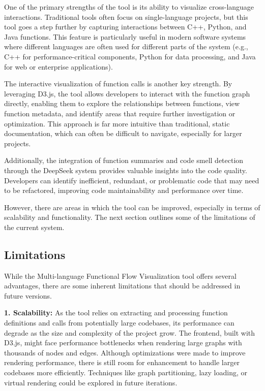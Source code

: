 \documentclass[10pt,twocolumn]{article}
\begin{document}
One of the primary strengths of the tool is its ability to visualize cross-language interactions. Traditional tools often focus on single-language projects, but this tool goes a step further by capturing interactions between C++, Python, and Java functions. This feature is particularly useful in modern software systems where different languages are often used for different parts of the system (e.g., C++ for performance-critical components, Python for data processing, and Java for web or enterprise applications).

The interactive visualization of function calls is another key strength. By leveraging D3.js, the tool allows developers to interact with the function graph directly, enabling them to explore the relationships between functions, view function metadata, and identify areas that require further investigation or optimization. This approach is far more intuitive than traditional, static documentation, which can often be difficult to navigate, especially for larger projects.

Additionally, the integration of function summaries and code smell detection through the DeepSeek system provides valuable insights into the code quality. Developers can identify inefficient, redundant, or problematic code that may need to be refactored, improving code maintainability and performance over time.

However, there are areas in which the tool can be improved, especially in terms of scalability and functionality. The next section outlines some of the limitations of the current system.

\subsection{Limitations}

While the Multi-language Functional Flow Visualization tool offers several advantages, there are some inherent limitations that should be addressed in future versions.

\textbf{1. Scalability:}  
As the tool relies on extracting and processing function definitions and calls from potentially large codebases, its performance can degrade as the size and complexity of the project grow. The frontend, built with D3.js, might face performance bottlenecks when rendering large graphs with thousands of nodes and edges. Although optimizations were made to improve rendering performance, there is still room for enhancement to handle larger codebases more efficiently. Techniques like graph partitioning, lazy loading, or virtual rendering could be explored in future iterations.
\end{document}
